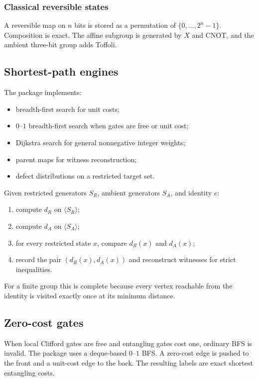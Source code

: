 \subsubsection{Classical reversible states}
A reversible map on $n$ bits is stored as a permutation of $\{0,\ldots,2^n-1\}$.  Composition is exact.  The affine subgroup is generated by $X$ and CNOT, and the ambient three-bit group adds Toffoli.

\subsection{Shortest-path engines}
The package implements:
\begin{itemize}
\item breadth-first search for unit costs;
\item $0$--$1$ breadth-first search when gates are free or unit cost;
\item Dijkstra search for general nonnegative integer weights;
\item parent maps for witness reconstruction;
\item defect distributions on a restricted target set.
\end{itemize}

\begin{algorithm}
Given restricted generators $S_R$, ambient generators $S_A$, and identity $e$:
\begin{enumerate}
\item compute $d_R$ on $\langle S_R\rangle$;
\item compute $d_A$ on $\langle S_A\rangle$;
\item for every restricted state $x$, compare $d_R(x)$ and $d_A(x)$;
\item record the pair $(d_R(x),d_A(x))$ and reconstruct witnesses for strict inequalities.
\end{enumerate}
\end{algorithm}

For a finite group this is complete because every vertex reachable from the identity is visited exactly once at its minimum distance.

\subsection{Zero-cost gates}
When local Clifford gates are free and entangling gates cost one, ordinary BFS is invalid.  The package uses a deque-based $0$--$1$ BFS.  A zero-cost edge is pushed to the front and a unit-cost edge to the back.  The resulting labels are exact shortest entangling costs.

